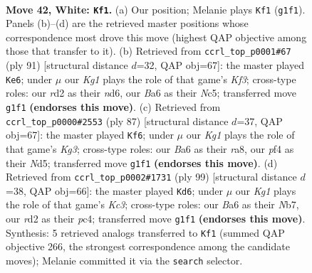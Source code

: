 \documentclass[11pt]{article}
\begin{document}
\clearpage

\begin{figure}[p]\centering
\begin{subfigure}{0.46\textwidth}\centering
\resizebox{\linewidth}{!}{%
\newchessgame
\chessboard[
  setfen={8/6k1/BN6/4p1p1/5p2/5n2/3r4/6K1 w - - 0 42},
  showmover=false,
  pgfstyle=straightmove, color=movearrow, markmove={g1-f1}
]}
\caption{}
\end{subfigure}\hfill
\begin{subfigure}{0.46\textwidth}\centering
\resizebox{\linewidth}{!}{%
\newchessgame
\chessboard[
  setfen={8/8/3N1k2/2nN3p/2p2P2/6P1/5K2/8 b - - 0 46},
  showmover=false,
  pgfstyle=straightmove, color=movearrow, markmove={f6-e6}
]}
\caption{}
\end{subfigure}
\\[4pt]
\begin{subfigure}{0.46\textwidth}\centering
\resizebox{\linewidth}{!}{%
\newchessgame
\chessboard[
  setfen={R7/8/4p1kp/3nN3/8/5P2/2r3P1/6K1 b - - 1 44},
  showmover=false,
  pgfstyle=straightmove, color=movearrow, markmove={g6-f6}
]}
\caption{}
\end{subfigure}\hfill
\begin{subfigure}{0.46\textwidth}\centering
\resizebox{\linewidth}{!}{%
\newchessgame
\chessboard[
  setfen={8/1n6/2k3p1/4N3/1KP1p1P1/8/8/8 b - - 1 50},
  showmover=false,
  pgfstyle=straightmove, color=movearrow, markmove={c6-d6}
]}
\caption{}
\end{subfigure}
\caption{\textbf{Move 42, White: \texttt{Kf1}.} (a) Our position; Melanie plays \texttt{Kf1} (\texttt{g1f1}). Panels (b)--(d) are the retrieved master positions whose correspondence most drove this move (highest QAP objective among those that transfer to it). (b) Retrieved from \texttt{ccrl\_top\_p0001\#67} (ply 91) [structural distance $d$=32, QAP obj=67]: the master played \texttt{Ke6}; under $\mu$ our \emph{Kg1} plays the role of that game's \emph{Kf3}; cross-type roles: our \emph{r}d2 as their \emph{n}d6, our \emph{B}a6 as their \emph{N}c5; transferred move \texttt{g1f1} \textbf{(endorses this move)}. (c) Retrieved from \texttt{ccrl\_top\_p0000\#2553} (ply 87) [structural distance $d$=37, QAP obj=67]: the master played \texttt{Kf6}; under $\mu$ our \emph{Kg1} plays the role of that game's \emph{Kg3}; cross-type roles: our \emph{B}a6 as their \emph{r}a8, our \emph{p}f4 as their \emph{N}d5; transferred move \texttt{g1f1} \textbf{(endorses this move)}. (d) Retrieved from \texttt{ccrl\_top\_p0002\#1731} (ply 99) [structural distance $d$=38, QAP obj=66]: the master played \texttt{Kd6}; under $\mu$ our \emph{Kg1} plays the role of that game's \emph{Kc3}; cross-type roles: our \emph{B}a6 as their \emph{N}b7, our \emph{r}d2 as their \emph{p}c4; transferred move \texttt{g1f1} \textbf{(endorses this move)}. Synthesis: 5 retrieved analogs transferred to \texttt{Kf1} (summed QAP objective 266, the strongest correspondence among the candidate moves); Melanie committed it via the \texttt{search} selector.}
\label{fig:thought-m82}
\end{figure}
\end{document}
